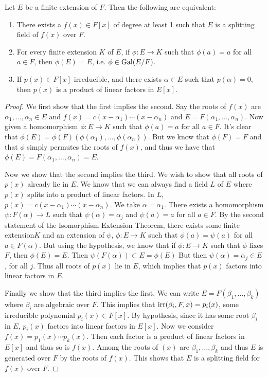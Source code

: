 \documentclass{../mathnotes}
\begin{document}
\begin{thm}
    Let $E$ be a finite extension of $F$. Then the following are equivalent:
    \begin{enumerate}
        \item There exists a $f(x)\in F[x]$ of degree at least 1 such that $E$ is a splitting field of $f(x)$ over $F$.
        \item For every finite extension $K$ of $E$, if $\phi:E\to K$ such that $\phi(a)=a$ for all $a\in F$, then
            $\phi(E)=E$, i.e. $\phi\in\operatorname{Gal}(E/F)$.
        \item If $p(x)\in F[x]$ irreducible, and there exists $\alpha\in E$ such that $p(\alpha)=0$, then
            $p(x)$ is a product of linear factors in $E[x]$.
    \end{enumerate}
\end{thm}
\begin{proof}
    We first show that the first implies the second. Say the roots of $f(x)$ are $\alpha_1,\ldots,\alpha_n\in E$
    and $f(x)=c(x-\alpha_1)\cdots(x-\alpha_n)$ and $E=F(\alpha_1,\ldots,\alpha_n)$. Now given a homomorphism $\phi: E\to K$ such that
    $\phi(a)=a$ for all $a\in F$. It's clear that $\phi(E)=\phi(F)(\phi(\alpha_1),\ldots,\phi(\alpha_n))$. But we know that
    $\phi(F)=F$ and that $\phi$ simply permutes the roots of $f(x)$, and thus we have that $\phi(E)=F(\alpha_1,\ldots,\alpha_n)=E$.

    Now we show that the second implies the third. We wish to show that all roots of $p(x)$ already lie in $E$. We know that
    we can always find a field $L$ of $E$ where $p(x)$ splits into a product of linear factors. In $L$,
    $p(x)=c(x-\alpha_1)\cdots(x-\alpha_n)$. We take $\alpha=\alpha_1$. There exists a homomorphism $\psi:F(\alpha)\to L$
    such that $\psi(\alpha)=\alpha_j$ and $\psi(a)=a$ for all $a\in F$. By the second statement of the Isomorphism Extension Theorem,
    there exists some finite extension$K$ and an extension of $\psi$, $\phi: E\to K$ such that $\phi(a)=\psi(a)$ for all $a\in F(\alpha)$.
    But using the hypothesis, we know that if $\phi:E\to K$ such that $\phi$ fixes $F$, then $\phi(E)=E$. Then $\psi(F(\alpha))\subset E=\phi(E)$
    But then $\psi(\alpha)=\alpha_j\in E$, for all $j$. Thus all roots of $p(x)$ lie in $E$, which implies that $p(x)$ factors into linear factors
    in $E$.
    
    Finally we show that the third implies the first. We can write $E=F(\beta_1,\ldots,\beta_k)$ where $\beta_i$ are algebraic over $F$.
    This implies that $\operatorname{irr}(\beta_i,F,x)=p_i(x)$, some irreducible polynomial $p_i(x)\in F[x]$. By hypothesis, since it has some root
    $\beta_i$ in $E$, $p_i(x)$ factors into linear factors in $E[x]$. Now we consider $f(x)=p_1(x)\cdots p_k(x)$. Then each factor is a product
    of linear factors in $E[x]$ and thus so is $f(x)$. Among the roots of $(x)$ are $\beta_1,\ldots,\beta_k$ and thus $E$ is generated
    over $F$ by the roots of $f(x)$. This shows that $E$ is a splitting field for $f(x)$ over $F$.
\end{proof}
\end{document}
